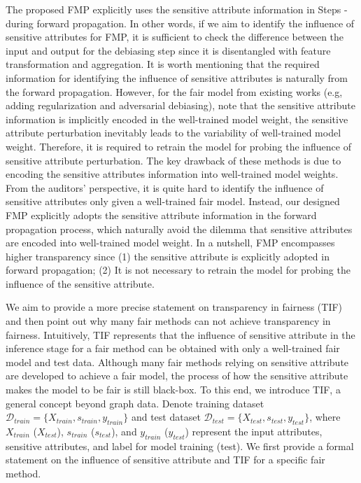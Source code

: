 \documentclass[letterpaper]{article} %
\theoremstyle{plain}
\theoremstyle{definition}
\theoremstyle{remark}
\begin{document}
The proposed FMP explicitly uses the sensitive attribute information in Steps \textbf{}-\textbf{} during forward propagation. In other words, if we aim to identify the influence of sensitive attributes for FMP, it is sufficient to check the difference between the input and output for the debiasing step since it is disentangled with feature transformation and aggregation. It is worth mentioning that the required information for identifying the influence of sensitive attributes is naturally from the forward propagation. However, for the fair model from existing works (e.g, adding regularization and adversarial debiasing), note that the sensitive attribute information is implicitly encoded in the well-trained model weight, the sensitive attribute perturbation inevitably leads to the variability of well-trained model weight. Therefore, it is required to retrain the model for probing the influence of sensitive attribute perturbation. The key drawback of these methods is due to encoding the sensitive attributes information into well-trained model weights. From the auditors' perspective, it is quite hard to identify the influence of sensitive attributes only given a well-trained fair model. Instead, our designed FMP explicitly adopts the sensitive attribute information in the forward propagation process, which naturally avoid the dilemma that sensitive attributes are encoded into well-trained model weight. In a nutshell, FMP encompasses higher transparency since (1) the sensitive attribute is explicitly adopted in forward propagation; (2) It is not necessary to retrain the model for probing the influence of the sensitive attribute. 

We aim to provide a more precise statement on transparency in fairness (TIF) and then point out why many fair methods can not achieve transparency in fairness. Intuitively, TIF represents that the influence of sensitive attribute in the inference stage for a fair method can be obtained with only a well-trained fair model and test data. Although many fair methods relying on sensitive attribute are developed to achieve a fair model, the process of how the sensitive attribute makes the model to be fair is still black-box. To this end, we introduce TIF, a general concept beyond graph data. Denote training dataset $\mathcal{D}_{train}=\{X_{train}, s_{train}, y_{train}\}$ and test dataset $\mathcal{D}_{test}=\{X_{test}, s_{test}, y_{test}\}$, where $X_{train}$ ($X_{test}$), $s_{train}$ ($s_{test}$), and $y_{train}$ ($y_{test}$) represent the input attributes, sensitive attributes, and label for model training (test).  We first provide a formal statement on the influence of sensitive attribute and TIF for a specific fair method.
\end{document}
